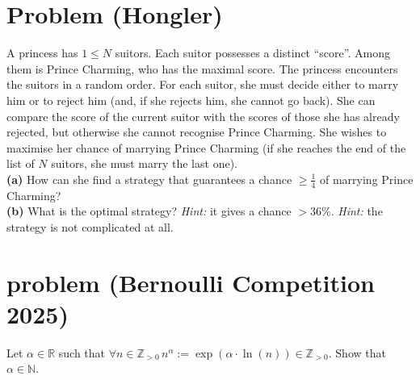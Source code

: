 \documentclass[11pt, a4paper, oneside]{article}
\newcommand{\problem}[1][]{\section{#1} \hfill \par}
\theoremstyle{remark}
\theoremstyle{lemma}
\begin{document}
\problem[Problem (Hongler)]
A princess has $1 \leq N$ suitors. Each suitor possesses a distinct ``score''. Among them is Prince Charming, who has the maximal score. The princess encounters the suitors in a random order. For each suitor, she must decide either to marry him or to reject him (and, if she rejects him, she cannot go back). She can compare the score of the current suitor with the scores of those she has already rejected, but otherwise she cannot recognise Prince Charming. She wishes to maximise her chance of marrying Prince Charming (if she reaches the end of the list of $N$ suitors, she must marry the last one).\\[0.5em]
\textbf{(a)} How can she find a strategy that guarantees a chance $\geq \frac{1}{4}$ of marrying Prince Charming?\\
\textbf{(b)} What is the optimal strategy? \emph{Hint:} it gives a chance $>36\%$. \emph{Hint:} the strategy is not complicated at all.\\


\problem[problem (Bernoulli Competition 2025)]
Let $\alpha\in\mathbb{R}$ such that $\forall n\in\mathbb{Z}_{>0}\, n^\alpha:=\exp(\alpha\cdot\ln(n))\in\mathbb{Z}_{>0}$. Show that $\alpha\in\mathbb{N}$.
\end{document}
